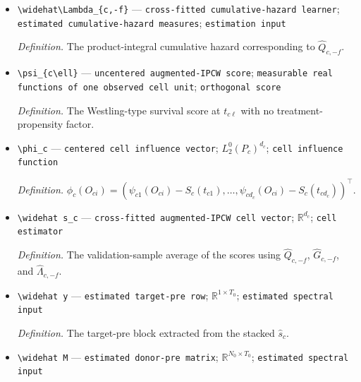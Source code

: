 \documentclass{article}
\begin{document}
\begin{itemize}
  \par\smallskip\noindent\emph{Definition.} A learner of \(G_c\) trained outside validation fold \(\mathcal V_{cf}\), selected from the estimability condition.
  \item \texttt{\textbackslash{}\allowbreak{}widehat\textbackslash{}\allowbreak{}Lambda\_\allowbreak{}\{c,\allowbreak{}-\allowbreak{}f\}\allowbreak{}} --- \texttt{cross-\allowbreak{}fitted cumulative-\allowbreak{}hazard learner}; \texttt{estimated cumulative-\allowbreak{}hazard measures}; \texttt{estimation input}
  \par\smallskip\noindent\emph{Definition.} The product-integral cumulative hazard corresponding to \(\widehat Q_{c,-f}\).
  \item \texttt{\textbackslash{}\allowbreak{}psi\_\allowbreak{}\{c\textbackslash{}\allowbreak{}ell\}\allowbreak{}} --- \texttt{uncentered augmented-\allowbreak{}IPCW score}; \texttt{measurable real functions of one observed cell unit}; \texttt{orthogonal score}
  \par\smallskip\noindent\emph{Definition.} The Westling-type survival score at \(t_{c\ell}\) with no treatment-propensity factor.
  \item \texttt{\textbackslash{}\allowbreak{}phi\_\allowbreak{}c} --- \texttt{centered cell influence vector}; \(L_2^0(P_c)^{d_c}\); \texttt{cell influence function}
  \par\smallskip\noindent\emph{Definition.} \(\phi_c(O_{ci})=(\psi_{c1}(O_{ci})-S_c(t_{c1}),\ldots,\psi_{cd_c}(O_{ci})-S_c(t_{cd_c}))^\top\).
  \item \texttt{\textbackslash{}\allowbreak{}widehat s\_\allowbreak{}c} --- \texttt{cross-\allowbreak{}fitted augmented-\allowbreak{}IPCW cell vector}; \(\mathbb R^{d_c}\); \texttt{cell estimator}
  \par\smallskip\noindent\emph{Definition.} The validation-sample average of the scores using \(\widehat Q_{c,-f}\), \(\widehat G_{c,-f}\), and \(\widehat\Lambda_{c,-f}\).
  \item \texttt{\textbackslash{}\allowbreak{}widehat y} --- \texttt{estimated target-\allowbreak{}pre row}; \(\mathbb R^{1\times T_0}\); \texttt{estimated spectral input}
  \par\smallskip\noindent\emph{Definition.} The target-pre block extracted from the stacked \(\widehat s_c\).
  \item \texttt{\textbackslash{}\allowbreak{}widehat M} --- \texttt{estimated donor-\allowbreak{}pre matrix}; \(\mathbb R^{N_0\times T_0}\); \texttt{estimated spectral input}

\end{itemize}
\end{document}
